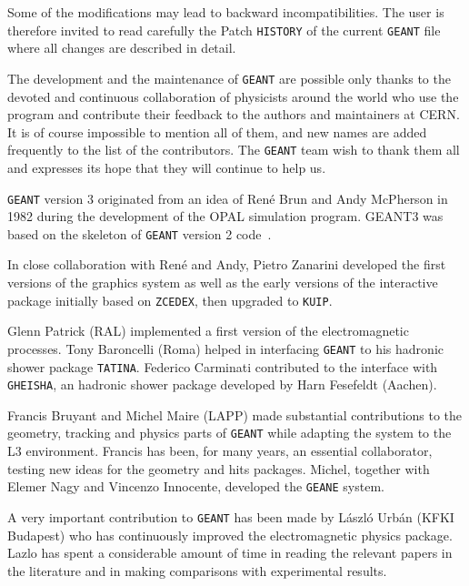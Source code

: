 Some of the modifications may lead to backward incompatibilities.
The user is therefore invited to read carefully the Patch {\tt HISTORY}
of the current {\tt GEANT} file where all changes are described in detail.
\par
The development and the maintenance of {\tt GEANT} are possible
only thanks to the devoted and continuous collaboration of
physicists around the world who use the program and contribute their
feedback to the authors and maintainers at CERN. It is of course
impossible
to mention all of them, and new names are added frequently to the
list of the contributors.
The {\tt GEANT} team wish to thank them all and expresses
its hope that they will continue to help us.
\par
{\tt GEANT} version 3 originated from an idea of Ren\'{e} Brun and Andy McPherson 
in 1982 during the development of the OPAL simulation program.
GEANT3 was based on the skeleton of {\tt GEANT} version 2 
code~\cite{bib-GEANT2}.
\par
In close collaboration with Ren\'{e} and Andy, Pietro Zanarini developed
the first versions of the graphics system as well as the early versions
of the interactive package initially based on {\tt ZCEDEX}, 
then upgraded to {\tt KUIP}.
\par
Glenn Patrick (RAL) implemented a first version of the electromagnetic 
processes. Tony Baroncelli (Roma) helped in interfacing {\tt GEANT} to his hadronic
shower package {\tt TATINA}. Federico Carminati contributed to the interface
with {\tt GHEISHA}, an hadronic shower package developed by Harn Fesefeldt (Aachen).
\par
Francis Bruyant and Michel Maire (LAPP) made substantial contributions 
to the geometry,
tracking and physics parts of {\tt GEANT} while adapting the system
to the L3 environment. Francis has been, for many years, an essential
collaborator, testing new ideas for the geometry and hits packages.
Michel, together with Elemer Nagy and Vincenzo Innocente, developed the 
{\tt GEANE} system.

\par
A very important contribution to {\tt GEANT} has been made by L\'{a}szl\'{o} 
Urb\'{a}n 
(KFKI Budapest) who has continuously improved the electromagnetic
physics package. Lazlo has spent a considerable amount of time in
reading the relevant papers in the literature and in making comparisons
with experimental results.


